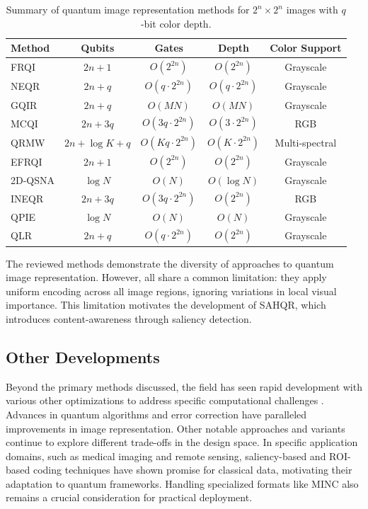 \documentclass[pdflatex,sn-mathphys-num,Numbered]{sn-jnl}
\theoremstyle{thmstyleone}
\theoremstyle{thmstyletwo}
\theoremstyle{thmstylethree}
\begin{document}
\begin{table}[h!]
\caption{Summary of quantum image representation methods for $2^n \times 2^n$ images with $q$-bit color depth.}
\label{tab:related_summary}
\centering
\begin{tabular}{@{}lcccc@{}}
\toprule
Method & Qubits & Gates & Depth & Color Support \\
\midrule
FRQI\cite{bib18} & $2n+1$ & $O(2^{2n})$ & $O(2^{2n})$ & Grayscale \\
NEQR\cite{bib19} & $2n+q$ & $O(q \cdot 2^{2n})$ & $O(q \cdot 2^{2n})$ & Grayscale \\
GQIR\cite{bib46,bib15} & $2n+q$ & $O(MN)$ & $O(MN)$ & Grayscale \\
MCQI\cite{bib47,bib13} & $2n+3q$ & $O(3q \cdot 2^{2n})$ & $O(3 \cdot 2^{2n})$ & RGB \\
QRMW\cite{bib48,bib49} & $2n+\log K+q$ & $O(Kq \cdot 2^{2n})$ & $O(K \cdot 2^{2n})$ & Multi-spectral \\
EFRQI\cite{bib50,bib51} & $2n+1$ & $O(2^{2n})$ & $O(2^{2n})$ & Grayscale \\
2D-QSNA\cite{bib52,bib53} & $\log N$ & $O(N)$ & $O(\log N)$ & Grayscale \\
INEQR\cite{bib54,bib55} & $2n+3q$ & $O(3q \cdot 2^{2n})$ & $O(2^{2n})$ & RGB \\
QPIE\cite{bib56,bib57} & $\log N$ & $O(N)$ & $O(N)$ & Grayscale \\
QLR\cite{bib58,bib49} & $2n+q$ & $O(q \cdot 2^{2n})$ & $O(2^{2n})$ & Grayscale \\
\bottomrule
\end{tabular}
\end{table}

The reviewed methods demonstrate the diversity of approaches to quantum image representation. However, all share a common limitation: they apply uniform encoding across all image regions, ignoring variations in local visual importance. This limitation motivates the development of SAHQR, which introduces content-awareness through saliency detection.

\subsection{Other Developments}

Beyond the primary methods discussed, the field has seen rapid development with various other optimizations to address specific computational challenges \cite{bib45}. Advances in quantum algorithms \cite{bib5,bib6,bib7,bib8} and error correction have paralleled improvements in image representation. Other notable approaches and variants \cite{bib20,bib21,bib22,bib23,bib17,bib24,bib25} continue to explore different trade-offs in the design space. In specific application domains, such as medical imaging and remote sensing, saliency-based and ROI-based coding techniques \cite{bib32,bib33,bib34,bib35,bib41,bib59} have shown promise for classical data, motivating their adaptation to quantum frameworks. Handling specialized formats like MINC \cite{bib60,bib61} also remains a crucial consideration for practical deployment.
\end{document}
